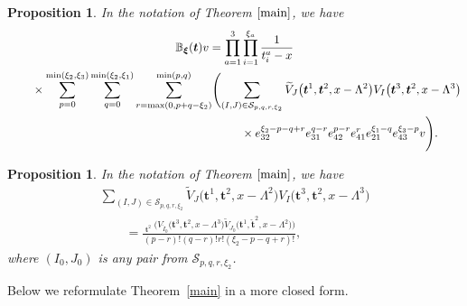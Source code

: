 \documentclass[pdftex]{sigma}
\numberwithin{equation}{section}
\newtheorem{Proposition}[Theorem]{Proposition}
 { \theoremstyle{definition}
\newtheorem{Definition}[Theorem]{Definition}
\newtheorem*{Example}{Example}
\newtheorem*{Remark}{Remark} }
\DeclareMathOperator{\Symb}{\overline{Sym} }
\begin{document}
\begin{Proposition}\label{prethprop}
In the notation of Theorem $\ref{main}$, we have
\begin{gather}
{\mathbb{B}}_{\boldsymbol{\xi}}(\boldsymbol{t}) v=\prod_{a=1}^{3}\prod_{i=1}^{\xi_a}\frac{1}{t^a_i-x}\nonumber\\
\qquad{}\times\sum\limits_{p=0}^{\min(\xi_2,\xi_3)} \sum\limits_{q=0}^{\min(\xi_2,\xi_1)}\sum\limits_{r=\max (0, p+q-\xi_2)}^{\min(p,q)} \Biggl(\sum\limits_{(I,J)\in \mathcal{S}_{p,q,r,\xi_2}} \widetilde{V}_{J}\bigl(\boldsymbol{t}^{ 1}, \boldsymbol{t}^{ 2},x-\Lambda^2\bigr)
V_{I}\bigl(\boldsymbol{t}^{ 3}, \boldsymbol{t}^{ 2},x-\Lambda^3\bigr)\nonumber\\
\qquad{}\hphantom{\times\sum\limits_{p=0}^{\min(\xi_2,\xi_3)} \sum\limits_{q=0}^{\min(\xi_2,\xi_1)}\sum\limits_{r=\max (0, p+q-\xi_2)}^{\min(p,q)} \Biggl(}{}
\times e_{32}^{\xi_2-p-q+r} e_{31}^{q-r} e_{42}^{p-r} e_{41}^{r} e_{21}^{\xi_1-q} e_{43}^{\xi_3-p} v\Biggr).\label{preth}
\end{gather}
\end{Proposition}

\begin{Proposition}\label{symprop}
In the notation of Theorem $\ref{main}$, we have
\begin{gather}
\sum\limits_{(I,J)\in \mathcal{S}_{p,q,r,\xi_2}} \widetilde{V}_{J}\bigl(\boldsymbol{t}^{ 1}, \boldsymbol{t}^{ 2},x-\Lambda^2\bigr) V_{I}\bigl(\boldsymbol{t}^{ 3}, \boldsymbol{t}^{ 2},x-\Lambda^3\bigr)
\nonumber\\
\qquad{} =\frac{ \Symb_{\boldsymbol{t}^2 } \bigl(V_{\check{I}_0}\bigl(\boldsymbol{t}^3, \boldsymbol{t}^2,x-\Lambda^3\bigr) \widetilde{V}_{J_0}\bigl( \boldsymbol{t}^1, \check{\boldsymbol{t}}^2,x-\Lambda^2\bigr)\bigr) }{(p-r)!(q-r)! r!(\xi_2-p-q+r)!},\label{sympropf}
\end{gather}
where $(I_0,J_0)$ is any pair from $\mathcal S_{p,q,r,\xi_2}$.
\end{Proposition}

Below we reformulate Theorem~\ref{main} in a more closed form.
\end{document}
